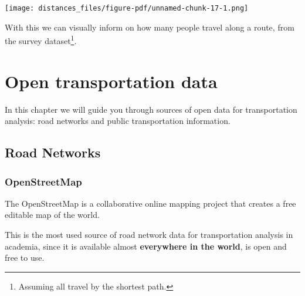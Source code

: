 \documentclass[
  letterpaper,
  DIV=11,
  numbers=noendperiod]{scrreprt}
\newenvironment{Shaded}{\begin{snugshade}}{\end{snugshade}}
\newcommand{\AttributeTok}[1]{\textcolor[rgb]{0.40,0.45,0.13}{#1}}
\newcommand{\CommentTok}[1]{\textcolor[rgb]{0.37,0.37,0.37}{#1}}
\newcommand{\DecValTok}[1]{\textcolor[rgb]{0.68,0.00,0.00}{#1}}
\newcommand{\FunctionTok}[1]{\textcolor[rgb]{0.28,0.35,0.67}{#1}}
\newcommand{\NormalTok}[1]{\textcolor[rgb]{0.00,0.23,0.31}{#1}}
\newcommand{\OtherTok}[1]{\textcolor[rgb]{0.00,0.23,0.31}{#1}}
\newcommand{\SpecialCharTok}[1]{\textcolor[rgb]{0.37,0.37,0.37}{#1}}
\newcommand{\StringTok}[1]{\textcolor[rgb]{0.13,0.47,0.30}{#1}}
\begin{document}
\begin{Shaded}
\end{Shaded}

\texttt{[image: distances\_files/figure-pdf/unnamed-chunk-17-1.png]}

With this we can visually inform on how many people travel along a
route, from the survey dataset\footnote{Assuming all travel by the
  shortest path.}.

\chapter{Open transportation data}\label{open-transportation-data}

In this chapter we will guide you through sources of open data for
transportation analysis: road networks and public transportation
information.

\section{Road Networks}\label{road-networks}

\subsection{OpenStreetMap}\label{openstreetmap}

The OpenStreetMap is a collaborative online mapping project that creates
a free editable map of the world.

This is the most used source of road network data for transportation
analysis in academia, since it is available almost \textbf{everywhere in
the world}, is open and free to use.
\end{document}
